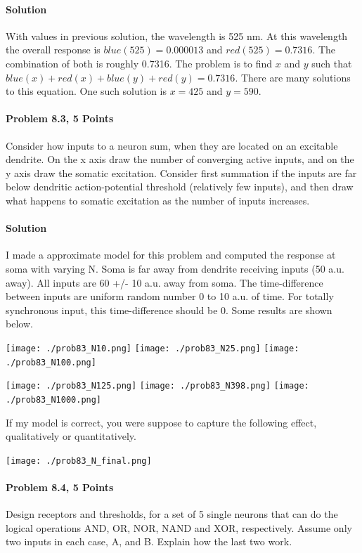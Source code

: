 \documentclass[a4paper,10pt]{article}
\begin{document}
\paragraph{Solution} With values in previous solution, the wavelength is 525 nm.
At this wavelength the overall response is $blue(525) = 0.000013$ and $red(525)
= 0.7316$. The combination of both is roughly 0.7316. The problem is to find
$x$ and $y$ such that $blue(x)+red(x) + blue(y) + red(y) = 0.7316$. 
There are many solutions to this equation. One such solution is $x = 425$ and
$y=590$.

\paragraph{Problem 8.3, 5 Points}
Consider how inputs to a neuron sum, when they are located on an excitable
dendrite. On the x axis draw the number of converging active inputs, and on the
y axis draw the somatic excitation. Consider first summation if the inputs are
far below dendritic action-potential threshold (relatively few inputs), and then
draw what happens to somatic excitation as the number of inputs increases.

\paragraph{Solution} I made a approximate model for this problem and computed
the response at soma with varying N. Soma is far away from dendrite receiving
inputs (50 a.u. away). All inputs are 60 +/- 10 a.u. away from soma. The
time-difference between inputs are uniform random number 0 to 10 a.u. of time.
For totally synchronous input, this time-difference should be 0. Some results
are shown below. 

\texttt{[image: ./prob83\_N10.png]} 
\texttt{[image: ./prob83\_N25.png]}
\texttt{[image: ./prob83\_N100.png]}
\par

\texttt{[image: ./prob83\_N125.png]}
\texttt{[image: ./prob83\_N398.png]}
\texttt{[image: ./prob83\_N1000.png]}

If my model is correct, you were suppose to capture the following effect,
qualitatively or quantitatively.

\texttt{[image: ./prob83\_N\_final.png]}


\paragraph{Problem 8.4, 5 Points}
Design receptors and thresholds, for a set of 5 single neurons that can  do the
logical operations AND, OR, NOR, NAND and XOR, respectively. Assume only two
inputs in each case, A, and B. Explain how the last two work.
\end{document}
